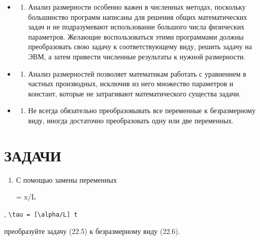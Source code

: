 \documentclass[
  ukrainian,
]{article}
\providecommand{\tightlist}{%
  \setlength{\itemsep}{0pt}\setlength{\parskip}{0pt}}
\begin{document}
\begin{itemize}
\tightlist
\item
  \begin{enumerate}
  \def\labelenumi{\arabic{enumi}.}
  \tightlist
  \item
    Анализ размерности особенно важен в численных методах, поскольку
    большинство программ написаны для решения общих математических задач
    и не подразумевают использование большого числа физических
    параметров. Желающие воспользоваться этими программами должны
    преобразовать свою задачу к соответствующему виду, решить задачу на
    ЭВМ, а затем привести численные результаты к нужной размерности.
  \end{enumerate}
\item
  \begin{enumerate}
  \def\labelenumi{\arabic{enumi}.}
  \setcounter{enumi}{1}
  \tightlist
  \item
    Анализ размерностей позволяет математикам работать с уравнением в
    частных производных, исключив из него множество параметров и
    констант, которые не затрагивают математического существа задачи.
  \end{enumerate}
\item
  \begin{enumerate}
  \def\labelenumi{\arabic{enumi}.}
  \setcounter{enumi}{2}
  \tightlist
  \item
    Не всегда обязательно преобразовывать все переменные к безразмерному
    виду, иногда достаточно преобразовать одну или две переменных.
  \end{enumerate}
\end{itemize}

\section{ЗАДАЧИ}\label{ux437ux430ux434ux430ux447ux438-2}

\begin{enumerate}
\def\labelenumi{\arabic{enumi}.}
\item
  С помощью замены переменных

  \xi = x/L
\end{enumerate}

, \texttt{\textbackslash{}tau\ =\ {[}\textbackslash{}alpha/L{]}\ t}

преобразуйте задачу (22.5) к безразмерному виду (22.6).
\end{document}
